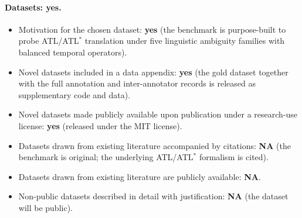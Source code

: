 \documentclass[letterpaper]{article}
\begin{document}
\paragraph{Datasets: yes.}
\begin{itemize}[leftmargin=1.2em,itemsep=2pt]
  \item Motivation for the chosen dataset: \textbf{yes} (the benchmark is purpose-built to probe ATL/ATL$^\ast$ translation under five linguistic ambiguity families with balanced temporal operators).
  \item Novel datasets included in a data appendix: \textbf{yes} (the gold dataset together with the full annotation and inter-annotator records is released as supplementary code and data).
  \item Novel datasets made publicly available upon publication under a research-use license: \textbf{yes} (released under the MIT license).
  \item Datasets drawn from existing literature accompanied by citations: \textbf{NA} (the benchmark is original; the underlying ATL/ATL$^\ast$ formalism is cited).
  \item Datasets drawn from existing literature are publicly available: \textbf{NA}.
  \item Non-public datasets described in detail with justification: \textbf{NA} (the dataset will be public).
\end{itemize}
\end{document}
